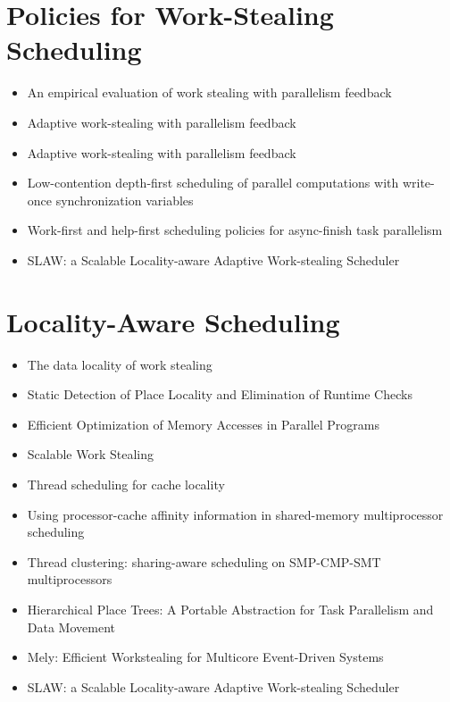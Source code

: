 \section*{Policies for Work-Stealing Scheduling}
\label{sec:lr-policies-for-work-stealing-scheduling}

\begin{itemize}
\item[\textbullet] An empirical evaluation of work stealing with
  parallelism feedback \cite{Agrawal2006}
\item[\textbullet] Adaptive work-stealing with parallelism feedback
  \cite{Agrawal2008}
\item[\textbullet] Adaptive work-stealing with parallelism feedback
  \cite{Agrawal2008a}
\item[\textbullet] Low-contention depth-first scheduling of parallel
  computations with write-once synchronization variables
  \cite{Fatourou2001}
\item[\textbullet] Work-first and help-first scheduling policies for
  async-finish task parallelism \cite{Guo2009}
\item[\textbullet] SLAW: a Scalable Locality-aware Adaptive
  Work-stealing Scheduler \cite{Guo2010}
\end{itemize}


\section*{Locality-Aware Scheduling}
\label{sec:lr-locality-aware-scheduling}

\begin{itemize}
\item[\checkmark] The data locality of work stealing \cite{Acar2002}
\item[\textbullet] Static Detection of Place Locality and Elimination
  of Runtime Checks \cite{Agarwal2008}
\item[\textbullet] Efficient Optimization of Memory Accesses in
  Parallel Programs \cite{Barik2009}
\item[\textbullet] Scalable Work Stealing \cite{Dinan2009}
\item[\textbullet] Thread scheduling for cache locality \cite{Philbin1996}
\item[\textbullet] Using processor-cache affinity information in
  shared-memory multiprocessor scheduling \cite{Squillante1993}
\item[\textbullet] Thread clustering: sharing-aware scheduling on
  SMP-CMP-SMT multiprocessors \cite{Tam2007}
\item[\textbullet] Hierarchical Place Trees: A Portable Abstraction
  for Task Parallelism and Data Movement \cite{Yan2009}
\item[\textbullet] Mely: Efficient Workstealing for Multicore
  Event-Driven Systems \cite{Gaud2010}
\item[\checkmark] SLAW: a Scalable Locality-aware Adaptive
  Work-stealing Scheduler \cite{Guo2010}
\end{itemize}


